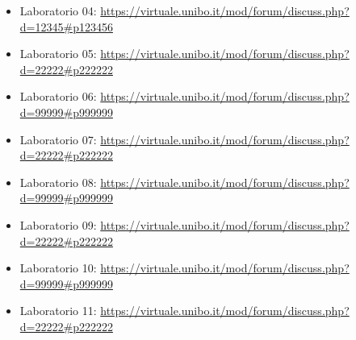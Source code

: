 \documentclass[a4paper,12pt]{report}
\begin{document}
\begin{itemize}
 \item Laboratorio 04: \url{https://virtuale.unibo.it/mod/forum/discuss.php?d=12345#p123456}
 \item Laboratorio 05: \url{https://virtuale.unibo.it/mod/forum/discuss.php?d=22222#p222222}
 \item Laboratorio 06: \url{https://virtuale.unibo.it/mod/forum/discuss.php?d=99999#p999999}
 \item Laboratorio 07: \url{https://virtuale.unibo.it/mod/forum/discuss.php?d=22222#p222222}
 \item Laboratorio 08: \url{https://virtuale.unibo.it/mod/forum/discuss.php?d=99999#p999999}
 \item Laboratorio 09: \url{https://virtuale.unibo.it/mod/forum/discuss.php?d=22222#p222222}
 \item Laboratorio 10: \url{https://virtuale.unibo.it/mod/forum/discuss.php?d=99999#p999999}
 \item Laboratorio 11: \url{https://virtuale.unibo.it/mod/forum/discuss.php?d=22222#p222222}
\end{itemize}




\end{document}
